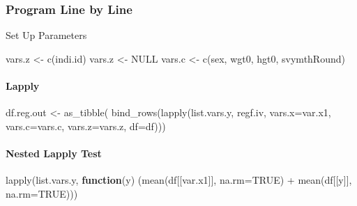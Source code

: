 \documentclass[
]{book}
\newenvironment{Shaded}{\begin{snugshade}}{\end{snugshade}}
\newcommand{\AttributeTok}[1]{\textcolor[rgb]{0.77,0.63,0.00}{#1}}
\newcommand{\ConstantTok}[1]{\textcolor[rgb]{0.00,0.00,0.00}{#1}}
\newcommand{\ControlFlowTok}[1]{\textcolor[rgb]{0.13,0.29,0.53}{\textbf{#1}}}
\newcommand{\FunctionTok}[1]{\textcolor[rgb]{0.00,0.00,0.00}{#1}}
\newcommand{\NormalTok}[1]{#1}
\newcommand{\OtherTok}[1]{\textcolor[rgb]{0.56,0.35,0.01}{#1}}
\newcommand{\SpecialCharTok}[1]{\textcolor[rgb]{0.00,0.00,0.00}{#1}}
\newcommand{\StringTok}[1]{\textcolor[rgb]{0.31,0.60,0.02}{#1}}
\begin{document}
\hypertarget{program-line-by-line}{%
\subsubsection{Program Line by Line}\label{program-line-by-line}}

Set Up Parameters

\begin{Shaded}
\begin{Highlighting}[]
\NormalTok{vars.z }\OtherTok{\textless{}{-}} \FunctionTok{c}\NormalTok{(}\StringTok{\textquotesingle{}indi.id\textquotesingle{}}\NormalTok{)}
\NormalTok{vars.z }\OtherTok{\textless{}{-}} \ConstantTok{NULL}
\NormalTok{vars.c }\OtherTok{\textless{}{-}} \FunctionTok{c}\NormalTok{(}\StringTok{\textquotesingle{}sex\textquotesingle{}}\NormalTok{, }\StringTok{\textquotesingle{}wgt0\textquotesingle{}}\NormalTok{, }\StringTok{\textquotesingle{}hgt0\textquotesingle{}}\NormalTok{, }\StringTok{\textquotesingle{}svymthRound\textquotesingle{}}\NormalTok{)}
\end{Highlighting}
\end{Shaded}

\hypertarget{lapply}{%
\paragraph{Lapply}\label{lapply}}

\begin{Shaded}
\begin{Highlighting}[]
\NormalTok{df.reg.out }\OtherTok{\textless{}{-}} \FunctionTok{as\_tibble}\NormalTok{(}
  \FunctionTok{bind\_rows}\NormalTok{(}\FunctionTok{lapply}\NormalTok{(list.vars.y, regf.iv,}
                   \AttributeTok{vars.x=}\NormalTok{var.x1, }\AttributeTok{vars.c=}\NormalTok{vars.c, }\AttributeTok{vars.z=}\NormalTok{vars.z, }\AttributeTok{df=}\NormalTok{df)))}
\end{Highlighting}
\end{Shaded}

\hypertarget{nested-lapply-test}{%
\paragraph{Nested Lapply Test}\label{nested-lapply-test}}

\begin{Shaded}
\begin{Highlighting}[]
\FunctionTok{lapply}\NormalTok{(list.vars.y, }\ControlFlowTok{function}\NormalTok{(y) (}\FunctionTok{mean}\NormalTok{(df[[var.x1]], }\AttributeTok{na.rm=}\ConstantTok{TRUE}\NormalTok{) }\SpecialCharTok{+}
                                   \FunctionTok{mean}\NormalTok{(df[[y]], }\AttributeTok{na.rm=}\ConstantTok{TRUE}\NormalTok{)))}
\end{Highlighting}
\end{Shaded}
\end{document}
